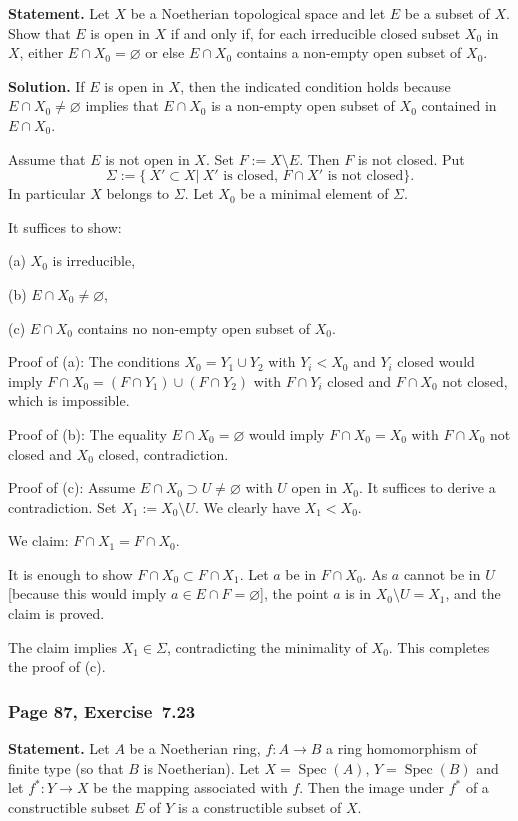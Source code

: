 \documentclass[12pt,letterpaper]{article}%
\newcommand{\Spec}{\operatorname{Spec}}\newcommand{\Sp}{\operatorname{Spec}}
\newcommand{\nn}{\noindent}
\begin{document}
\textbf{Statement.} Let $X$ be a Noetherian topological space and let $E$ be a subset of $X$. Show that $E$ is open in $X$ if and only if, for each irreducible closed subset $X_0$ in $X$, either $E\cap X_0=\varnothing$ or else $E\cap X_0$ contains a non-empty open subset of $X_0$.

\nn\textbf{Solution.} If $E$ is open in $X$, then the indicated condition holds because $E\cap X_0\ne\varnothing$ implies that $E\cap X_0$ is a non-empty open subset of $X_0$ contained in $E\cap X_0$. 

Assume that $E$ is not open in $X$. Set $F:=X\setminus E$. Then $F$ is not closed. Put 
$$
\Sigma:=\{\ X'\subset X|\ X'\text{ is closed, }F\cap X'\text{ is not closed}\}.
$$ 
In particular $X$ belongs to $\Sigma$. Let $X_0$ be a minimal element of $\Sigma$.

It suffices to show:

\qquad(a) $X_0$ is irreducible,

\qquad(b) $E\cap X_0\ne\varnothing$,

\qquad(c) $E\cap X_0$ contains no non-empty open subset of $X_0$.

\nn Proof of (a): The conditions $X_0=Y_1\cup Y_2$ with $Y_i<X_0$ and $Y_i$ closed would imply $F\cap X_0=(F\cap Y_1)\cup(F\cap Y_2)$ with $F\cap Y_i$ closed and $F\cap X_0$ not closed, which is impossible.

\nn Proof of (b): The equality $E\cap X_0=\varnothing$ would imply $F\cap X_0=X_0$ with $F\cap X_0$ not closed and $X_0$ closed, contradiction.

\nn Proof of (c): Assume $E\cap X_0\supset U\ne\varnothing$ with $U$ open in $X_0$. It suffices to derive a contradiction. Set $X_1:=X_0\setminus U$. We clearly have $X_1<X_0$. 

We claim: $F\cap X_1=F\cap X_0$. 

It is enough to show $F\cap X_0\subset F\cap X_1$. Let $a$ be in $F\cap X_0$. As $a$ cannot be in $U$ [because this would imply $a\in E\cap F=\varnothing$], the point $a$ is in $X_0\setminus U=X_1$, and the claim is proved.

The claim implies $X_1\in\Sigma$, contradicting the minimality of $X_0$. This completes the proof of (c).

\subsubsection{Page 87, Exercise~7.23}\label{ex7.23}%

\textbf{Statement.} Let $A$ be a Noetherian ring, $f:A\to B$ a ring homomorphism of finite type (so that $B$ is Noetherian). Let $X=\Spec(A)$, $Y=\Spec(B)$ and let $f^*:Y\to X$ be the mapping associated with $f$. Then the image under $f^*$ of a constructible subset $E$ of $Y$ is a constructible subset of $X$.
\end{document}
